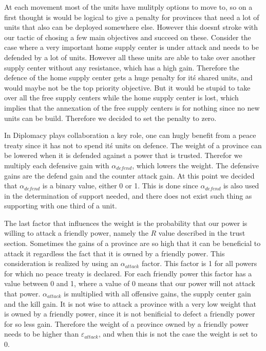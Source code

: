 \documentclass[a4paper]{article} %
\begin{document}
At each movement most of the units have mulitply options to move to, so on a first thought is would be logical to give a penalty for provinces that need a lot of units that also can be deployed somewhere else. However this doesn\'t stroke with our tactic of chosing a few main objectives and succeed on these. Consider the case where a very important home supply center is under attack and needs to be defended by a lot of units. However all these units are able to take over another supply center without any resistance, which has a high gain. Therefore the defence of the home supply center gets a huge penalty for it\'s shared units, and would maybe not be the top priority objective. But it would be stupid to take over all the free supply centers while the home supply center is lost, which implies that the annexation of the free supply centers is for nothing since no new units can be build. Therefore we decided to set the penalty to zero. 

In Diplomacy plays collaboration a key role, one can hugly benefit from a peace treaty since it has not to spend it\'s units on defence. The weight of a province can be lowered when it is defended against a power that is trusted. Therefor we multiply each defensive gain with $\alpha_{defend}$, which lowers the weight. The defensive gains are the defend gain and the counter attack gain. At this point we decided that $\alpha_{defend}$ is a binary value, either 0 or 1. This is done since $\alpha_{defend}$ is also used in the determination of support needed, and there does not exist such thing as supporting with one third of a unit. 

The last factor that influences the weight is the probability that our power is willing to attack a friendly power, namely the $R$ value described in the trust section. Sometimes the gains of a province are so high that it can be beneficial to attack it regardless the fact that it is owned by a friendly power. This consideration is realized by using an $\alpha_{attack}$ factor. This factor is 1 for all powers for which no peace treaty is declared. For each friendly power this factor has a value between 0 and 1, where a value of 0 means that our power will not attack that power. $\alpha_{attack}$ is multiplied with all offensive gains, the supply center gain and the kill gain. It is not wise to attack a province with a very low weight that is owned by a friendly power, since it is not benificial to defect a friendly power for so less gain. Therefore the weight of a province owned by a friendly power needs to be higher than $\varepsilon_{attack}$, and when this is not the case the weight is set to 0. 
\end{document}
